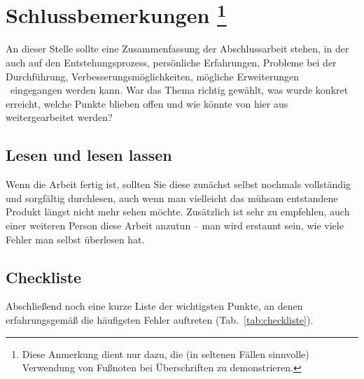 \chapter[Schlussbemerkungen]{Schlussbemerkungen%
\protect\footnote{Diese Anmerkung dient nur dazu, die (in seltenen Fällen
sinnvolle) Verwendung von Fußnoten bei Überschriften zu demonstrieren.}}%
\label{cha:Schluss}

An dieser Stelle sollte eine Zusammenfassung der Abschlussarbeit stehen, in
der auch auf den Entstehungsprozess, persönliche Erfahrungen, Probleme bei
der Durchführung, Verbesserungsmöglichkeiten, mögliche Erweiterungen \usw\
eingegangen werden kann. War das Thema richtig gewählt, was wurde konkret
erreicht, welche Punkte blieben offen und wie könnte von hier aus
weitergearbeitet werden?


\section{Lesen und lesen lassen}

Wenn die Arbeit fertig ist, sollten Sie diese zunächst selbst nochmals
vollständig und sorgfältig durchlesen, auch wenn man vielleicht das mühsam
entstandene Produkt längst nicht mehr sehen möchte. Zusätzlich ist sehr zu
empfehlen, auch einer weiteren Person diese Arbeit anzutun -- man wird
erstaunt sein, wie viele Fehler man selbst überlesen hat.


\section{Checkliste}

Abschließend noch eine kurze Liste der wichtigsten Punkte, an denen
erfahrungsgemäß die häufigsten Fehler auftreten (Tab.\ \ref{tab:checkliste}).

